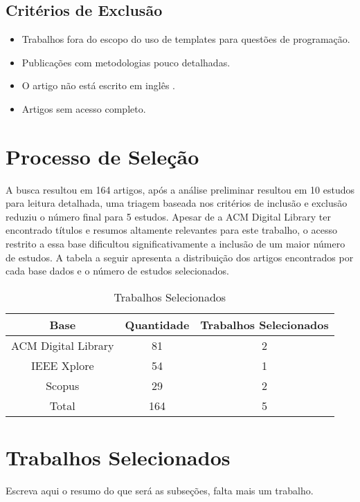 \subsection{Critérios de Exclusão}
\begin{itemize}
    \item Trabalhos fora do escopo do uso de templates para questões de programação. 
    \item Publicações com metodologias pouco detalhadas. 
    \item O artigo não está escrito em inglês .
    \item Artigos sem acesso completo. 
\end{itemize}

\section{Processo de Seleção}
A busca resultou em 164 artigos, após a análise preliminar resultou em 10 estudos para leitura detalhada, uma triagem baseada nos critérios de inclusão e exclusão reduziu o número final para 5 estudos. Apesar de a ACM Digital Library ter encontrado títulos e resumos altamente relevantes para este trabalho, o acesso restrito a essa base dificultou significativamente a inclusão de um maior número de estudos. A tabela a seguir apresenta a distribuição dos artigos encontrados por cada base dados e o número de estudos selecionados.

\begin{table}[htbp]
    \centering
    \begin{tabular}{|c|c|c|}
        \hline
        Base & Quantidade & Trabalhos Selecionados \\ \hline
        ACM Digital Library & 81 & 2 \\ \hline
        IEEE Xplore & 54 & 1 \\ \hline
        Scopus & 29 & 2 \\ \hline
        Total & 164 & 5 \\ \hline
    \end{tabular}
    \caption{Trabalhos Selecionados}
    \label{tab:table-trabalhos-selecionados}
\end{table}


\section{Trabalhos Selecionados}
Escreva aqui o resumo do que será as subseções, falta mais um trabalho. 

